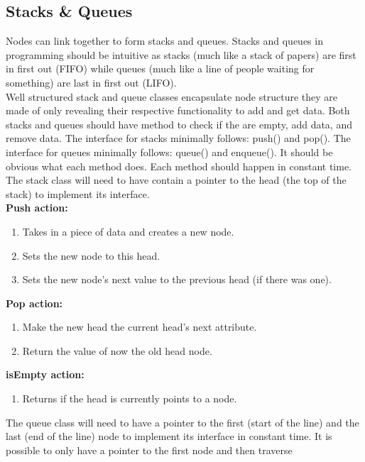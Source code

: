 \documentclass[letterpaper, 10pt]{article}
\begin{document}
\subsection{Stacks \& Queues}
Nodes can link together to form stacks and queues.
Stacks and queues in programming should be intuitive as stacks (much like a stack of papers)
are first in first out (FIFO) while queues (much like a line of people waiting for something) are last in first out (LIFO).\\
\newline
Well structured stack and queue classes encapsulate node structure they are made of only revealing their 
respective functionality to add and get data. Both stacks and queues should have method to check if the are empty, add data, and remove data.
The interface for stacks minimally follows: push() and pop(). The interface for queues minimally follows:
queue() and enqueue(). It should be obvious what each method does. Each method should happen in constant time. \\
\hfill \break \newline
The stack class will need to have contain a pointer to the head (the top of the stack) to implement its interface.\\
\textbf{Push action:}
\begin{enumerate}
    \item Takes in a piece of data and creates a new node.
    \item Sets the new node to this head.
    \item Sets the new node's next value to the previous head (if there was one).
\end{enumerate}

\textbf{Pop action:}
\begin{enumerate}
    \item Make the new head the current head's next attribute.
    \item Return the value of now the old head node.
\end{enumerate}

\textbf{isEmpty action:}
\begin{enumerate}
    \item Returns if the head is currently points to a node.
\end{enumerate}
The queue class will need to have a pointer to the first (start of the line) and the last (end of the line) node
to implement its interface in constant time. It is possible to only have a pointer to the first node and then traverse
\end{document}
